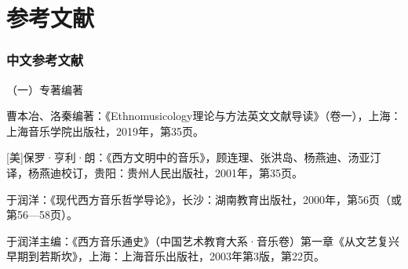 
\chapter*{参考文献}


\subsection*{中文参考文献}

\noindent （一）专著编著

\begin{achievements}
\item 曹本冶、洛秦编著：《Ethnomusicology理论与方法英文文献导读》（卷一），上海：上海音乐学院出版社，2019年，第35页。
\item {[美]}保罗·亨利·朗：《西方文明中的音乐》，顾连理、张洪岛、杨燕迪、汤亚汀译，杨燕迪校订，贵阳：贵州人民出版社，2001年，第35页。
\item 于润洋：《现代西方音乐哲学导论》，长沙：湖南教育出版社，2000年，第56页（或第56—58页）。
\item 于润洋主编：《西方音乐通史》（中国艺术教育大系·音乐卷）第一章《从文艺复兴早期到若斯坎》，上海：上海音乐出版社，2003年第3版，第22页。
\end{achievements}

